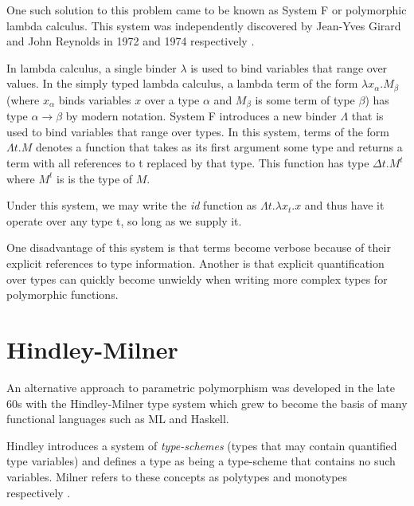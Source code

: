 \documentclass{ProgressReport}[2020/09/15]
\begin{document}
          One such solution to this problem came to be known as System F
          or polymorphic lambda calculus. This system was independently
          discovered by Jean-Yves Girard and John Reynolds in 1972 and 1974
          respectively \cite{Girard1972,reynolds1974}.
      
          In lambda calculus, a single binder $\lambda$ is used to bind variables
          that range over values. In the simply typed lambda calculus, a
          lambda term of the form $\lambda x_{\alpha}.M_{\beta}$ (where
          $x_{\alpha}$ binds variables $x$ over a type $\alpha$ and
          $M_{\beta}$ is some term of type $\beta $) has type
          $\alpha\to\beta$ by modern notation. System F introduces a new
          binder $\Lambda$ that is used to bind variables that range over
          types. In this system, terms of the form $\Lambda t.M$ denotes a
          function that takes as its first argument some type and returns a
          term with all references to t replaced by that type. This function
          has type $\Delta t.M^{t}$ where $M^t$ is is the type of $M$.
      
          Under this system, we may write the \emph{id} function as $\Lambda t
          . \lambda x_t . x$ and thus have it operate over any type t,
          so long as we supply it.
      
          One disadvantage of this system is that terms become verbose
          because of their explicit references to type
          information. Another is that explicit quantification over
          types can quickly become unwieldy when writing more complex
          types for polymorphic functions.

          \section{Hindley-Milner}
            An alternative approach to parametric polymorphism was
            developed in the late 60s with the Hindley-Milner type
            system which grew to become the basis of many functional
            languages such as ML and Haskell.
                        
            Hindley introduces a system of \textit{type-schemes}
            \cite{hindley1969} (types that may contain quantified type
            variables) and defines a type as being a type-scheme that
            contains no such variables. Milner refers to these
            concepts as polytypes and monotypes respectively
            \cite{milner1978}. 
            
\end{document}
